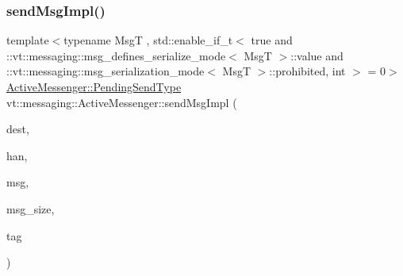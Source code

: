 \subsubsection{\texorpdfstring{send\+Msg\+Impl()}{sendMsgImpl()}\hspace{0.1cm}{\footnotesize\ttfamily [4/4]}}
{\footnotesize\ttfamily template$<$typename MsgT , std\+::enable\+\_\+if\+\_\+t$<$ true and \+::vt\+::messaging\+::msg\+\_\+defines\+\_\+serialize\+\_\+mode$<$ Msg\+T $>$\+::value and \+::vt\+::messaging\+::msg\+\_\+serialization\+\_\+mode$<$ Msg\+T $>$\+::prohibited, int $>$  = 0$>$ \\
\hyperlink{structvt_1_1messaging_1_1_active_messenger_a3626a6ca76d8ad4ec7c3b47a2c70d3a8}{Active\+Messenger\+::\+Pending\+Send\+Type} vt\+::messaging\+::\+Active\+Messenger\+::send\+Msg\+Impl (\begin{DoxyParamCaption}\item[{\hyperlink{namespacevt_a866da9d0efc19c0a1ce79e9e492f47e2}{Node\+Type}}]{dest,  }\item[{\hyperlink{namespacevt_af64846b57dfcaf104da3ef6967917573}{Handler\+Type}}]{han,  }\item[{\hyperlink{structvt_1_1messaging_1_1_msg_shared_ptr}{Msg\+Shared\+Ptr}$<$ MsgT $>$ \&}]{msg,  }\item[{\hyperlink{namespacevt_aab8d55968084610ce3b17057981e9300}{Byte\+Type}}]{msg\+\_\+size,  }\item[{\hyperlink{namespacevt_a84ab281dae04a52a4b243d6bf62d0e52}{Tag\+Type}}]{tag }\end{DoxyParamCaption})\hspace{0.3cm}{\ttfamily [inline]}}

\mbox{\label{structvt_1_1messaging_1_1_active_messenger_ad1406c7f73624f030a0d74dd210ca9d6}} 
